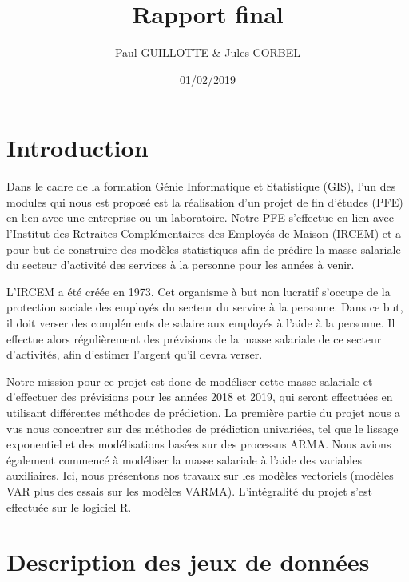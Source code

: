 \documentclass[11pt,]{article}
\title{Rapport final}
\author{Paul GUILLOTTE \& Jules CORBEL}
\date{01/02/2019}
\begin{document}
\maketitle

{
\setcounter{tocdepth}{2}
\tableofcontents
\clearpage
}
\section*{Introduction}\label{introduction}

Dans le cadre de la formation Génie Informatique et Statistique (GIS),
l'un des modules qui nous est proposé est la réalisation d'un projet de
fin d'études (PFE) en lien avec une entreprise ou un laboratoire. Notre
PFE s'effectue en lien avec l'Institut des Retraites Complémentaires des
Employés de Maison (IRCEM) et a pour but de construire des modèles
statistiques afin de prédire la masse salariale du secteur d'activité
des services à la personne pour les années à venir.

L'IRCEM a été créée en 1973. Cet organisme à but non lucratif s'occupe
de la protection sociale des employés du secteur du service à la
personne. Dans ce but, il doit verser des compléments de salaire aux
employés à l'aide à la personne. Il effectue alors régulièrement des
prévisions de la masse salariale de ce secteur d'activités, afin
d'estimer l'argent qu'il devra verser.

Notre mission pour ce projet est donc de modéliser cette masse salariale
et d'effectuer des prévisions pour les années 2018 et 2019, qui seront
effectuées en utilisant différentes méthodes de prédiction. La première
partie du projet nous a vus nous concentrer sur des méthodes de
prédiction univariées, tel que le lissage exponentiel et des
modélisations basées sur des processus ARMA. Nous avions également
commencé à modéliser la masse salariale à l'aide des variables
auxiliaires. Ici, nous présentons nos travaux sur les modèles vectoriels
(modèles VAR plus des essais sur les modèles VARMA). L'intégralité du
projet s'est effectuée sur le logiciel R.

\newpage

\section{Description des jeux de
données}\label{description-des-jeux-de-donnees}
\end{document}
